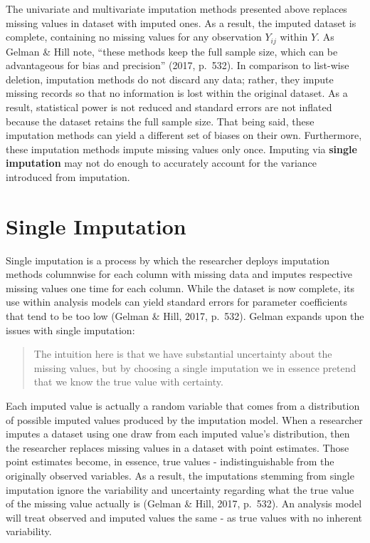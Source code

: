 \documentclass[12pt,oneside]{chicagocapstone}
\begin{document}
The univariate and multivariate imputation methods presented above
replaces missing values in dataset with imputed ones. As a result, the
imputed dataset is complete, containing no missing values for any
observation \(Y_{ij}\) within \(Y\). As Gelman \& Hill note, ``these
methods keep the full sample size, which can be advantageous for bias
and precision'' (2017, p.~532). In comparison to list-wise deletion,
imputation methods do not discard any data; rather, they impute missing
records so that no information is lost within the original dataset. As a
result, statistical power is not reduced and standard errors are not
inflated because the dataset retains the full sample size. That being
said, these imputation methods can yield a different set of biases on
their own. Furthermore, these imputation methods impute missing values
only once. Imputing via \textbf{single imputation} may not do enough to
accurately account for the variance introduced from imputation.

\hypertarget{background-single-imputation}{\section*{Single
Imputation}\label{background-single-imputation}}

Single imputation is a process by which the researcher deploys
imputation methods columnwise for each column with missing data and
imputes respective missing values one time for each column. While the
dataset is now complete, its use within analysis models can yield
standard errors for parameter coefficients that tend to be too low
(Gelman \& Hill, 2017, p.~532). Gelman expands upon the issues with
single imputation:
\begin{quote}
The intuition here is that we have substantial uncertainty about the
missing values, but by choosing a single imputation we in essence
pretend that we know the true value with certainty.
\end{quote}
Each imputed value is actually a random variable that comes from a
distribution of possible imputed values produced by the imputation
model. When a researcher imputes a dataset using one draw from each
imputed value's distribution, then the researcher replaces missing
values in a dataset with point estimates. Those point estimates become,
in essence, true values - indistinguishable from the originally observed
variables. As a result, the imputations stemming from single imputation
ignore the variability and uncertainty regarding what the true value of
the missing value actually is (Gelman \& Hill, 2017, p.~532). An
analysis model will treat observed and imputed values the same - as true
values with no inherent variability.
\end{document}
